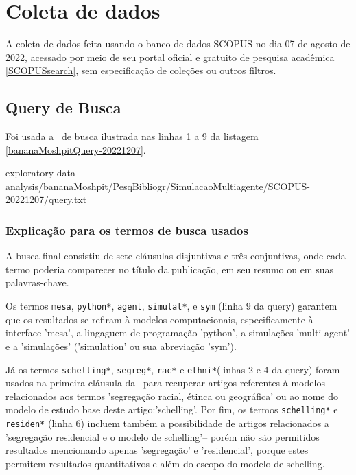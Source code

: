 \section{Coleta de dados\label{S@bananaMoshpit:coleta}}

A coleta de dados feita usando o banco de dados SCOPUS no dia 07 de agosto de 2022, acessado por meio de seu portal oficial e gratuito de pesquisa acadêmica \ref{SCOPUSsearch}, sem especificação de coleções ou outros filtros.

\subsection{Query de Busca}
Foi usada a \query\  de busca ilustrada nas linhas 1 a 9 da listagem \ref{bananaMoshpitQuery-20221207}.


{exploratory-data-analysis/bananaMoshpit/PesqBibliogr/SimulacaoMultiagente/SCOPUS-20221207/query.txt}

\subsubsection{Explicação para os termos de busca usados}

A busca final consistiu de sete cláusulas disjuntivas e três conjuntivas, onde cada termo poderia comparecer no título da publicação, em seu resumo ou em suas palavras-chave.

Os termos \texttt{mesa}, \texttt{python*}, \texttt{agent}, \texttt{simulat*}, e \texttt{sym} (linha 9 da query) garantem que os resultados se refiram à modelos computacionais, especificamente à interface 'mesa', a lingaguem de programação 'python', a simulações 'multi-agent' e a 'simulações' ('simulation' ou sua abreviação 'sym').

Já os termos \texttt{schelling*}, \texttt{segreg*}, \texttt{rac*} e \texttt{ethni*}(linhas 2 e 4 da query) foram usados na primeira cláusula da \query\  para recuperar artigos referentes à modelos relacionados aos termos 'segregação racial, étinca ou geográfica' ou ao nome do modelo de estudo base deste artigo:'schelling'. Por fim, os termos \texttt{schelling*} e \texttt{residen*} (linha 6) incluem também a possibilidade de artigos relacionados a 'segregação residencial e o modelo de schelling'-- porém não são permitidos resultados mencionando apenas 'segregação' e 'residencial', porque estes permitem resultados quantitativos e além do escopo do modelo de schelling.


